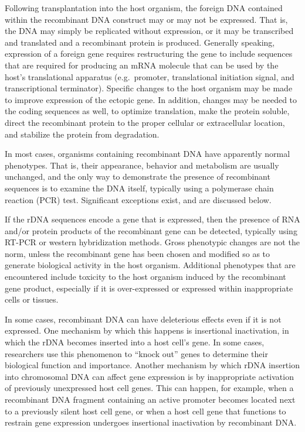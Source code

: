 Following transplantation into the host organism, the foreign DNA contained within the recombinant DNA construct may or may not be expressed. That is, the DNA may simply be replicated without expression, or it may be transcribed and translated and a recombinant protein is produced. Generally speaking, expression of a foreign gene requires restructuring the gene to include sequences that are required for producing an mRNA molecule that can be used by the host's translational apparatus (e.g.~promoter, translational initiation signal, and transcriptional terminator). Specific changes to the host organism may be made to improve expression of the ectopic gene. In addition, changes may be needed to the coding sequences as well, to optimize translation, make the protein soluble, direct the recombinant protein to the proper cellular or extracellular location, and stabilize the protein from degradation.

In most cases, organisms containing recombinant DNA have apparently normal phenotypes. That is, their appearance, behavior and metabolism are usually unchanged, and the only way to demonstrate the presence of recombinant sequences is to examine the DNA itself, typically using a polymerase chain reaction (PCR) test. Significant exceptions exist, and are discussed below.

If the rDNA sequences encode a gene that is expressed, then the presence of RNA and/or protein products of the recombinant gene can be detected, typically using RT-PCR or western hybridization methods. Gross phenotypic changes are not the norm, unless the recombinant gene has been chosen and modified so as to generate biological activity in the host organism. Additional phenotypes that are encountered include toxicity to the host organism induced by the recombinant gene product, especially if it is over-expressed or expressed within inappropriate cells or tissues.

In some cases, recombinant DNA can have deleterious effects even if it is not expressed. One mechanism by which this happens is insertional inactivation, in which the rDNA becomes inserted into a host cell's gene. In some cases, researchers use this phenomenon to ``knock out'' genes to determine their biological function and importance. Another mechanism by which rDNA insertion into chromosomal DNA can affect gene expression is by inappropriate activation of previously unexpressed host cell genes. This can happen, for example, when a recombinant DNA fragment containing an active promoter becomes located next to a previously silent host cell gene, or when a host cell gene that functions to restrain gene expression undergoes insertional inactivation by recombinant DNA.

